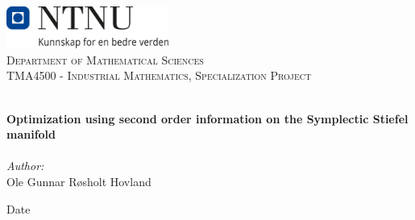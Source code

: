 
\begin{titlepage}
\vbox{ }
\vbox{ }
\begin{center}
\includegraphics[width=0.40\textwidth]{Images/NTNU_logo.png}\\[1cm]
\textsc{\LARGE Department of Mathematical Sciences}\\[1.5cm]
\textsc{\Large TMA4500 - Industrial Mathematics, Specialization Project }\\[0.5cm]
\vbox{ }

\HRule \\[0.4cm]
{ \huge \bfseries Optimization using second order information on the Symplectic Stiefel manifold}\\[0.4cm]
\HRule \\[1.5cm]

\large
\emph{Author:}\\
Ole Gunnar Røsholt Hovland
\vfill

{\large Date}
\end{center}
\end{titlepage}
